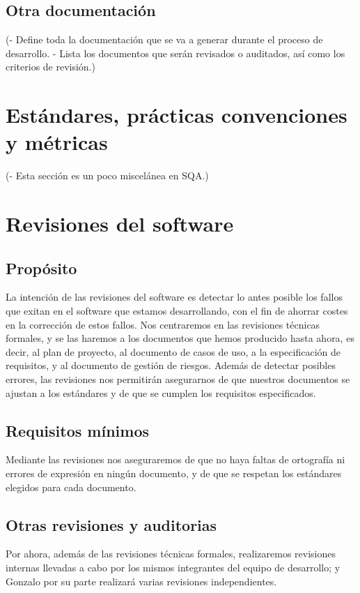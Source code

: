 \documentclass[spanish,a4paper,11pt, twoside]{report}	%
\begin{document}
	\section{Otra documentación}

	(- Define toda la documentación que se va a generar
	durante el proceso de desarrollo.
	- Lista los documentos que serán revisados o
	auditados, así como los criterios de revisión.)

\newpage
\mbox{}
\thispagestyle{empty}						%
\newpage

\chapter{ Estándares, prácticas convenciones y métricas}
	(- Esta sección es un poco miscelánea en SQA.) %

\newpage
\mbox{}
\thispagestyle{empty}						%
\newpage

\chapter{ Revisiones del software}
	\section{Propósito}
	La intención de las revisiones del software es detectar lo antes posible los fallos que exitan en el software que estamos desarrollando, con el fin de ahorrar costes en la corrección de estos fallos. Nos centraremos en las revisiones técnicas formales,
	y se las haremos a los documentos que hemos producido hasta ahora, es decir, al plan de proyecto, al documento de casos de uso, a la especificación de requisitos, y al documento de gestión de riesgos. Además de detectar posibles errores,
 	las revisiones nos permitirán asegurarnos de que nuestros documentos se ajustan a los estándares y de que se cumplen los requisitos especificados.

	\section{Requisitos mínimos}
	Mediante las revisiones nos aseguraremos de que no haya faltas de ortografía ni errores de expresión en ningún documento, y de que se respetan los estándares elegidos para cada documento.
	\section{Otras revisiones y auditorias}
	Por ahora, además de las revisiones técnicas formales, realizaremos revisiones internas llevadas a cabo por los mismos integrantes del  equipo de desarrollo;  y Gonzalo por su parte realizará varias revisiones independientes.
\end{document}
